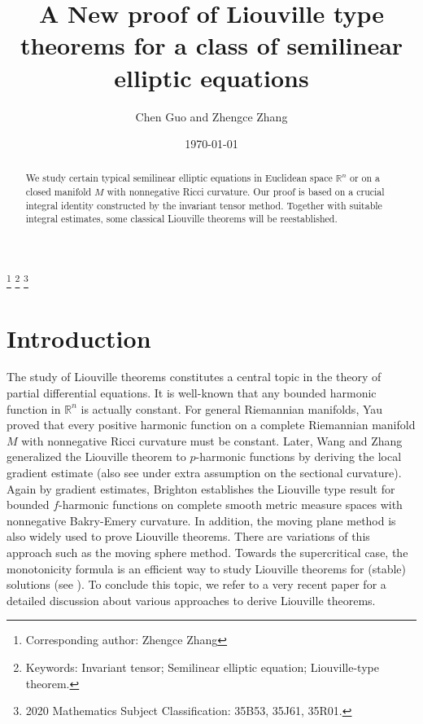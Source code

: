 \documentclass[reqno,12pt]{amsart}
\numberwithin{equation}{section}
\newcommand{\bR}{{\mathbb R}}  %
\begin{document}
\begin{CJK}{UTF8}{gkai}
		
		
		\title[  Liouville theorem for $\Delta u+f(u)=0$ ]{A New proof of Liouville type theorems for a class of semilinear elliptic equations }
		\author{Chen Guo and Zhengce Zhang}
		\date{\today}
		\address[Chen Guo]{School of Mathematics and Statistics, Xi'an Jiaotong University, Xi'an, 710049, P. R. China}
	
		\address[Zhengce Zhang]{School of Mathematics and Statistics, Xi'an Jiaotong University, Xi'an, 710049, P. R. China}
		\thanks{Corresponding author: Zhengce Zhang}
		\thanks{Keywords: Invariant tensor; Semilinear elliptic equation; Liouville-type theorem.  }
		\thanks{2020 Mathematics Subject Classification: 35B53, 35J61, 35R01.}
		
		
		
		\begin{abstract}
			We study  certain typical   semilinear elliptic equations in Euclidean space $\bR^{n}$ or on a closed manifold $M$ with nonnegative Ricci curvature. Our proof is based on a crucial integral identity constructed by the invariant tensor method. Together with  suitable integral estimates, some classical Liouville theorems will be reestablished.
		\end{abstract}
		\maketitle		
		\section{Introduction}\label{Introduction}
		The study of Liouville theorems constitutes a central topic in the theory of partial differential equations. It is well-known that any bounded harmonic function in $\bR^{n}$ is actually constant. For  general Riemannian manifolds, Yau \cite{Y1} proved that every positive harmonic function on a complete Riemannian manifold $M$ with nonnegative Ricci curvature must be constant.
		 Later, Wang and Zhang \cite{WZ} generalized the Liouville theorem to $p$-harmonic functions by deriving the local gradient estimate (also see\cite{KN} under extra assumption on the sectional curvature).
		 Again by gradient estimates, Brighton\cite{B1} establishes the Liouville type result for bounded $f$-harmonic functions on complete smooth metric measure spaces with nonnegative Bakry-Emery curvature.
		 In addition, the moving plane method is also widely used to prove Liouville theorems\cite{CL,CDQ}. There are variations of this approach such as the moving sphere method. Towards the supercritical case, the monotonicity formula is an efficient way to study  Liouville theorems for (stable) solutions (see \cite{DGW,DFP}). To conclude this topic,  we refer to a very recent paper \cite{QS} for a detailed discussion about various approaches to derive Liouville theorems.
		 

\end{CJK}
\end{document}

